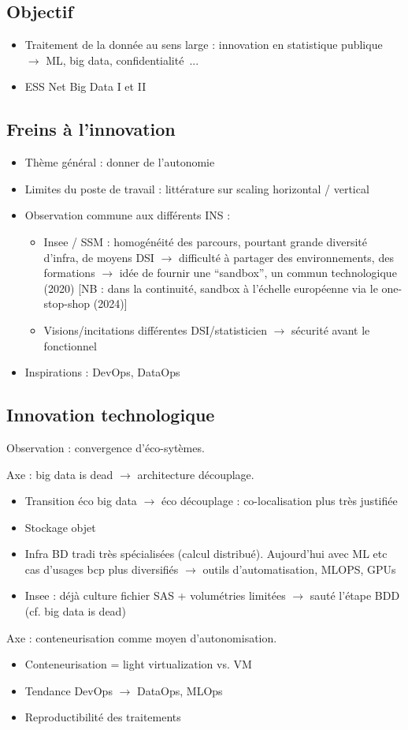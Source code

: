 \subsection{Objectif}
\begin{itemize}
    \item Traitement de la donnée au sens large : innovation en statistique publique $\rightarrow$ ML, big data, confidentialité~...
    \item ESS Net Big Data I et II
\end{itemize}

\subsection{Freins à l'innovation}
\begin{itemize}
    \item Thème général : donner de l'autonomie
    \item Limites du poste de travail : littérature sur scaling horizontal / vertical
    \item Observation commune aux différents INS :
    \begin{itemize}
        \item Insee / SSM : homogénéité des parcours, pourtant grande diversité d'infra, de moyens DSI $\rightarrow$ difficulté à partager des environnements, des formations $\rightarrow$ idée de fournir une ``sandbox'', un commun technologique (2020) [NB : dans la continuité, sandbox à l'échelle européenne via le one-stop-shop (2024)]
        \item Visions/incitations différentes DSI/statisticien $\rightarrow$ sécurité avant le fonctionnel
    \end{itemize}
    \item Inspirations : DevOps, DataOps
\end{itemize}

\subsection{Innovation technologique}
Observation : convergence d'éco-sytèmes.

Axe : big data is dead $\rightarrow$ architecture découplage.
\begin{itemize}
    \item Transition éco big data $\rightarrow$ éco découplage : co-localisation plus très justifiée
    \item Stockage objet
    \item Infra BD tradi très spécialisées (calcul distribué). Aujourd'hui avec ML etc cas d'usages bcp plus diversifiés $\rightarrow$ outils d'automatisation, MLOPS, GPUs
    \item Insee : déjà culture fichier SAS + volumétries limitées $\rightarrow$ sauté l'étape BDD (cf. big data is dead)
\end{itemize}

Axe : conteneurisation comme moyen d'autonomisation.
\begin{itemize}
    \item Conteneurisation = light virtualization vs. VM
    \item Tendance DevOps $\rightarrow$ DataOps, MLOps
    \item Reproductibilité des traitements
\end{itemize}